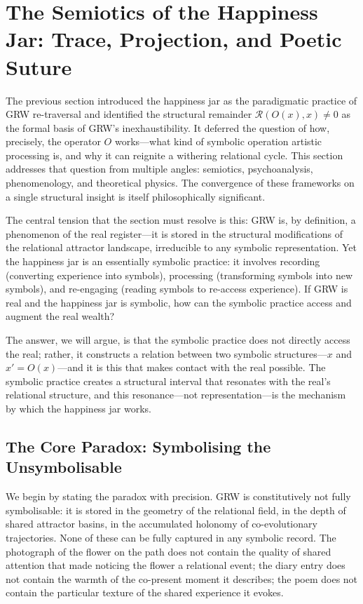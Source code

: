 \section{The Semiotics of the Happiness Jar: Trace, Projection, and Poetic Suture}
\label{p15:sec:semiotics}

\noindent
The previous section introduced the happiness jar as the paradigmatic practice of GRW re-traversal and identified the structural remainder $\mathcal{R}(O(x), x) \neq 0$ as the formal basis of GRW's inexhaustibility. It deferred the question of how, precisely, the operator $O$ works---what kind of symbolic operation artistic processing is, and why it can reignite a withering relational cycle. This section addresses that question from multiple angles: semiotics, psychoanalysis, phenomenology, and theoretical physics. The convergence of these frameworks on a single structural insight is itself philosophically significant.

The central tension that the section must resolve is this: GRW is, by definition, a phenomenon of the real register---it is stored in the structural modifications of the relational attractor landscape, irreducible to any symbolic representation. Yet the happiness jar is an essentially symbolic practice: it involves recording (converting experience into symbols), processing (transforming symbols into new symbols), and re-engaging (reading symbols to re-access experience). If GRW is real and the happiness jar is symbolic, how can the symbolic practice access and augment the real wealth?

The answer, we will argue, is that the symbolic practice does not directly access the real; rather, it constructs a relation between two symbolic structures---$x$ and $x' = O(x)$---and it is this  that makes contact with the real possible. The symbolic practice creates a structural interval that resonates with the real's relational structure, and this resonance---not representation---is the mechanism by which the happiness jar works.

\subsection{The Core Paradox: Symbolising the Unsymbolisable}
\label{p15:subsec:paradox}

\noindent
We begin by stating the paradox with precision. GRW is constitutively not fully symbolisable: it is stored in the geometry of the relational field, in the depth of shared attractor basins, in the accumulated holonomy of co-evolutionary trajectories. None of these can be fully captured in any symbolic record. The photograph of the flower on the path does not contain the quality of shared attention that made noticing the flower a relational event; the diary entry does not contain the warmth of the co-present moment it describes; the poem does not contain the particular texture of the shared experience it evokes.

